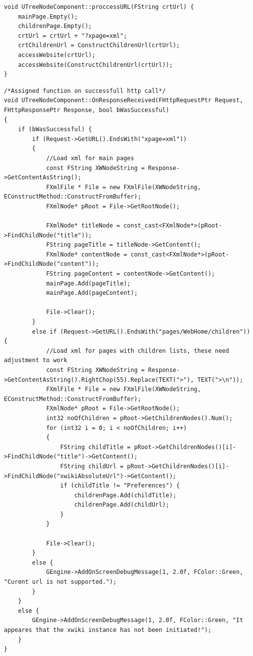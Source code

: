 \begin{lstlisting}[breaklines=true, postbreak=\mbox{\textcolor{red}{$\hookrightarrow$}\space}, caption=Codul funcție principale ce este apelabilă din scripturile blueprint]
void UTreeNodeComponent::proccessURL(FString crtUrl) {
	mainPage.Empty();
	childrenPage.Empty();
	crtUrl = crtUrl + "?xpage=xml";
	crtChildrenUrl = ConstructChildrenUrl(crtUrl);
	accessWebsite(crtUrl);
	accessWebsite(ConstructChildrenUrl(crtUrl));
}
\end{lstlisting}

\begin{lstlisting}[breaklines=true, postbreak=\mbox{\textcolor{red}{$\hookrightarrow$}\space},caption={Funcția ce parsează xml-ul returnat de \textit{http request}, și adaugă informații în listele menționate anterior}]
/*Assigned function on successfull http call*/
void UTreeNodeComponent::OnResponseReceived(FHttpRequestPtr Request, FHttpResponsePtr Response, bool bWasSuccessful)
{
	if (bWasSuccessful) {
		if (Request->GetURL().EndsWith("xpage=xml"))
		{
			//Load xml for main pages
			const FString XWNodeString = Response->GetContentAsString();
			FXmlFile * File = new FXmlFile(XWNodeString, EConstructMethod::ConstructFromBuffer);
			FXmlNode* pRoot = File->GetRootNode();

			FXmlNode* titleNode = const_cast<FXmlNode*>(pRoot->FindChildNode("title"));
			FString pageTitle = titleNode->GetContent();
			FXmlNode* contentNode = const_cast<FXmlNode*>(pRoot->FindChildNode("content"));
			FString pageContent = contentNode->GetContent();
			mainPage.Add(pageTitle);
			mainPage.Add(pageContent);

			File->Clear();
		}
		else if (Request->GetURL().EndsWith("pages/WebHome/children")) {
			//Load xml for pages with children lists, these need adjustment to work
			const FString XWNodeString = Response->GetContentAsString().RightChop(55).Replace(TEXT(">"), TEXT(">\n"));
			FXmlFile * File = new FXmlFile(XWNodeString, EConstructMethod::ConstructFromBuffer);
			FXmlNode* pRoot = File->GetRootNode();
			int32 noOfChildren = pRoot->GetChildrenNodes().Num();
			for (int32 i = 0; i < noOfChildren; i++)
			{
				FString childTitle = pRoot->GetChildrenNodes()[i]->FindChildNode("title")->GetContent();
				FString childUrl = pRoot->GetChildrenNodes()[i]->FindChildNode("xwikiAbsoluteUrl")->GetContent();
				if (childTitle != "Preferences") {
					childrenPage.Add(childTitle);
					childrenPage.Add(childUrl);
				}
			}

			File->Clear();
		}
		else {
			GEngine->AddOnScreenDebugMessage(1, 2.0f, FColor::Green, "Curent url is not supported.");
		}
	}
	else {
		GEngine->AddOnScreenDebugMessage(1, 2.0f, FColor::Green, "It appeares that the xwiki instance has not been initiated!");
	}
}
\end{lstlisting}

